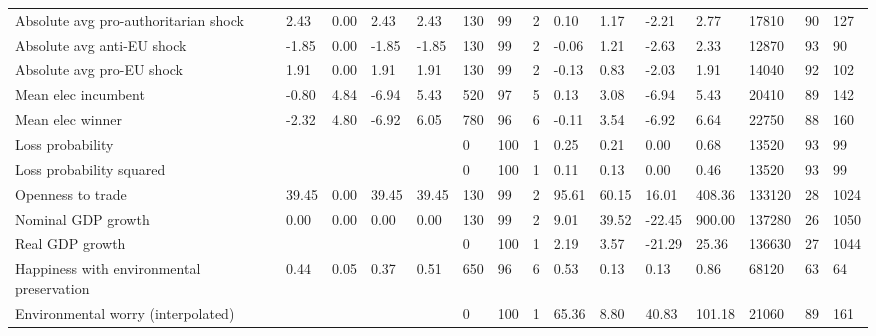 \begin{longtable}{lllllllllllllll}
Absolute avg pro-authoritarian shock & 2.43 & 0.00 & 2.43 & 2.43 & 130 & 99 & 2 & 0.10 & 1.17 & -2.21 & 2.77 & 17810 & 90 & 127\\
Absolute avg anti-EU shock & -1.85 & 0.00 & -1.85 & -1.85 & 130 & 99 & 2 & -0.06 & 1.21 & -2.63 & 2.33 & 12870 & 93 & 90\\
\addlinespace
Absolute avg pro-EU shock & 1.91 & 0.00 & 1.91 & 1.91 & 130 & 99 & 2 & -0.13 & 0.83 & -2.03 & 1.91 & 14040 & 92 & 102\\
Mean elec incumbent & -0.80 & 4.84 & -6.94 & 5.43 & 520 & 97 & 5 & 0.13 & 3.08 & -6.94 & 5.43 & 20410 & 89 & 142\\
Mean elec winner & -2.32 & 4.80 & -6.92 & 6.05 & 780 & 96 & 6 & -0.11 & 3.54 & -6.92 & 6.64 & 22750 & 88 & 160\\
Loss probability &  &  &  &  & 0 & 100 & 1 & 0.25 & 0.21 & 0.00 & 0.68 & 13520 & 93 & 99\\
Loss probability squared &  &  &  &  & 0 & 100 & 1 & 0.11 & 0.13 & 0.00 & 0.46 & 13520 & 93 & 99\\
\addlinespace
Openness to trade & 39.45 & 0.00 & 39.45 & 39.45 & 130 & 99 & 2 & 95.61 & 60.15 & 16.01 & 408.36 & 133120 & 28 & 1024\\
Nominal GDP growth & 0.00 & 0.00 & 0.00 & 0.00 & 130 & 99 & 2 & 9.01 & 39.52 & -22.45 & 900.00 & 137280 & 26 & 1050\\
Real GDP growth &  &  &  &  & 0 & 100 & 1 & 2.19 & 3.57 & -21.29 & 25.36 & 136630 & 27 & 1044\\
Happiness with environmental preservation & 0.44 & 0.05 & 0.37 & 0.51 & 650 & 96 & 6 & 0.53 & 0.13 & 0.13 & 0.86 & 68120 & 63 & 64\\
Environmental worry (interpolated) &  &  &  &  & 0 & 100 & 1 & 65.36 & 8.80 & 40.83 & 101.18 & 21060 & 89 & 161\\
\bottomrule
\end{longtable}
